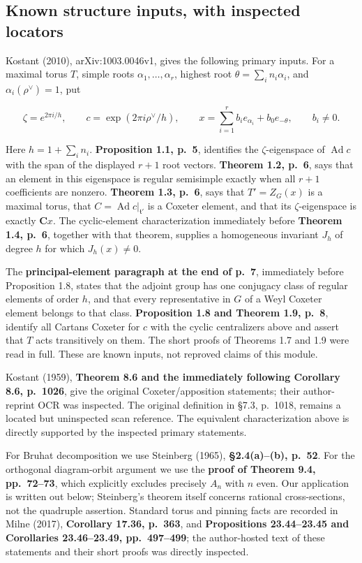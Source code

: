 \subsection{Known structure inputs, with inspected
locators}\label{known-structure-inputs-with-inspected-locators}

Kostant (2010), arXiv:1003.0046v1, gives the following primary inputs.
For a maximal torus \(T\), simple roots \(\alpha_1,\ldots,\alpha_r\),
highest root \(\theta=\sum_i n_i\alpha_i\), and
\(\alpha_i(\rho^\vee)=1\), put

\[
 \zeta=e^{2\pi i/h},\qquad
 c=\exp(2\pi i\rho^\vee/h),\qquad
 x=\sum_{i=1}^r b_i e_{\alpha_i}+b_0e_{-\theta},
 \qquad b_i\ne0.
 \tag{CC-APG.1}
\]

Here \(h=1+\sum_i n_i\). \textbf{Proposition 1.1, p.~5}, identifies the
\(\zeta\)-eigenspace of \(\operatorname{Ad}c\) with the span of the
displayed \(r+1\) root vectors. \textbf{Theorem 1.2, p.~6}, says that an
element in this eigenspace is regular semisimple exactly when all
\(r+1\) coefficients are nonzero. \textbf{Theorem 1.3, p.~6}, says that
\(T'=Z_G(x)\) is a maximal torus, that
\(C=\operatorname{Ad}c|_{\mathfrak t'}\) is a Coxeter element, and that
its \(\zeta\)-eigenspace is exactly \(\mathbf Cx\). The cyclic-element
characterization immediately before \textbf{Theorem 1.4, p.~6}, together
with that theorem, supplies a homogeneous invariant \(J_h\) of degree
\(h\) for which \(J_h(x)\ne0\).

The \textbf{principal-element paragraph at the end of p.~7}, immediately
before Proposition 1.8, states that the adjoint group has one conjugacy
class of regular elements of order \(h\), and that every representative
in \(G\) of a Weyl Coxeter element belongs to that class.
\textbf{Proposition 1.8 and Theorem 1.9, p.~8}, identify all Cartans
Coxeter for \(c\) with the cyclic centralizers above and assert that
\(T\) acts transitively on them. The short proofs of Theorems 1.7 and
1.9 were read in full. These are known inputs, not reproved claims of
this module.

Kostant (1959), \textbf{Theorem 8.6 and the immediately following
Corollary 8.6, p.~1026}, give the original Coxeter/apposition
statements; their author-reprint OCR was inspected. The original
definition in §7.3, p.~1018, remains a located but uninspected scan
reference. The equivalent characterization above is directly supported
by the inspected primary statements.

For Bruhat decomposition we use Steinberg (1965), \textbf{§2.4(a)--(b),
p.~52}. For the orthogonal diagram-orbit argument we use the
\textbf{proof of Theorem 9.4, pp.~72--73}, which explicitly excludes
precisely \(A_n\) with \(n\) even. Our application is written out below;
Steinberg's theorem itself concerns rational cross-sections, not the
quadruple assertion. Standard torus and pinning facts are recorded in
Milne (2017), \textbf{Corollary 17.36, p.~363}, and \textbf{Propositions
23.44--23.45 and Corollaries 23.46--23.49, pp.~497--499}; the
author-hosted text of these statements and their short proofs was
directly inspected.

